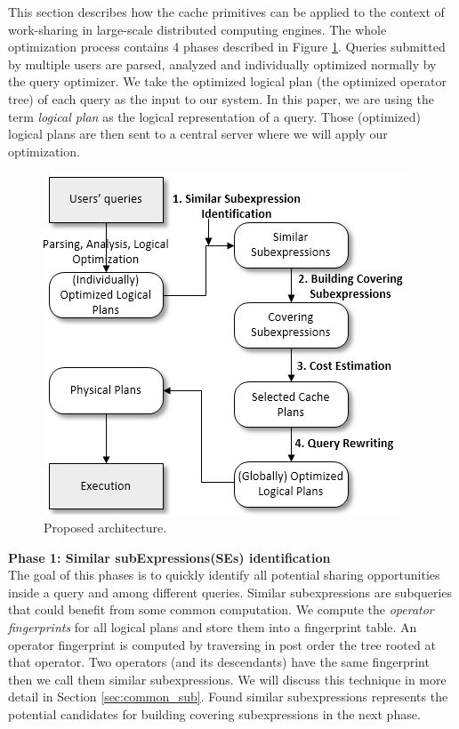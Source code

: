 This section describes how the cache primitives can be applied to the context of work-sharing in large-scale distributed computing engines. The whole optimization process contains 4 phases described in Figure \ref{fig:phases_mqo}. Queries submitted by multiple users are parsed, analyzed and individually optimized normally by the query optimizer. We take the optimized logical plan (the optimized operator tree) of each query as the input to our system. In this paper, we are using the term \emph{logical plan} as the logical representation of a query. Those (optimized) logical plans are then sent to a central server where we will apply our optimization.

\begin{figure}[!htb]
	\centering
 	\includegraphics[scale=0.65]{figures/phases_mqo}
   	\caption{Proposed architecture.} 
   	\label{fig:phases_mqo}
\end{figure}


\textbf{Phase 1: Similar subExpressions(SEs) identification}\\
The goal of this phases is to quickly identify all potential sharing opportunities inside a query and among different queries. Similar subexpressions are subqueries that could benefit from some common computation. We compute the \emph{operator fingerprints} for all logical plans and store them into a fingerprint table. An operator fingerprint is computed by traversing in post order the tree rooted at that operator. Two operators (and its descendants) have the same fingerprint then we call them similar subexpressions. We will discuss this technique in more detail in Section \ref{sec:common_sub}. Found similar subexpressions represents the potential candidates for building covering subexpressions in the next phase.

